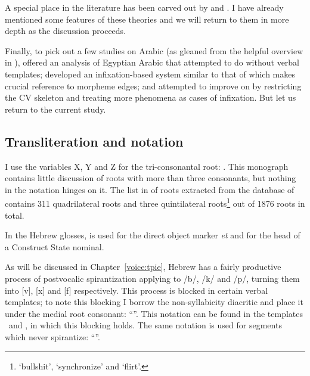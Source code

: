 A special place in the literature has been carved out by \cite{doron03,doron13voice} and \cite{arad03,arad05}. I have already mentioned some features of these theories and we will return to them in more depth as the discussion proceeds.

Finally, to pick out a few studies on Arabic (as gleaned from the helpful overview in \citealt{ussishkin00phd}), \cite{darden92} offered an analysis of Egyptian Arabic that attempted to do without verbal templates; \cite{mcomber95} developed an infixation-based system similar to that of \cite{jjmcc81} which makes crucial reference to morpheme edges; and \cite{ratcliffe97,ratcliffe98} attempted to improve on \cite{jjmccprince90} by restricting the CV skeleton and treating more phenomena as cases of infixation. But let us return to the current study.

	\subsection{Transliteration and notation} \label{sec:data:notation}
I use the variables X, Y and Z for the tri-consonantal root: . This monograph contains little discussion of roots with more than three consonants, but nothing in the notation hinges on it. The list in of roots extracted from the database of \cite{ehrenfeld12} contains 311 quadrilateral roots and three quintilateral roots\footnote{ `bullshit',  `synchronize' and  `flirt'.} out of 1876 roots in total.

In the Hebrew glosses,  is used for the direct object marker \emph{et} and  for the head of a Construct State nominal.

As will be discussed in Chapter~\ref{voice:tpie}, Hebrew has a fairly productive process of postvocalic spirantization applying to /b/, /k/ and /p/, turning them into [v], [x] and [f] respectively. This process is blocked in certain verbal templates; to note this blocking I borrow the non-syllabicity diacritic and place it under the medial root consonant: ``''. This notation can be found in the templates \tpie~and \thit, in which this blocking holds. The same notation is used for segments which never spirantize: ``''.

